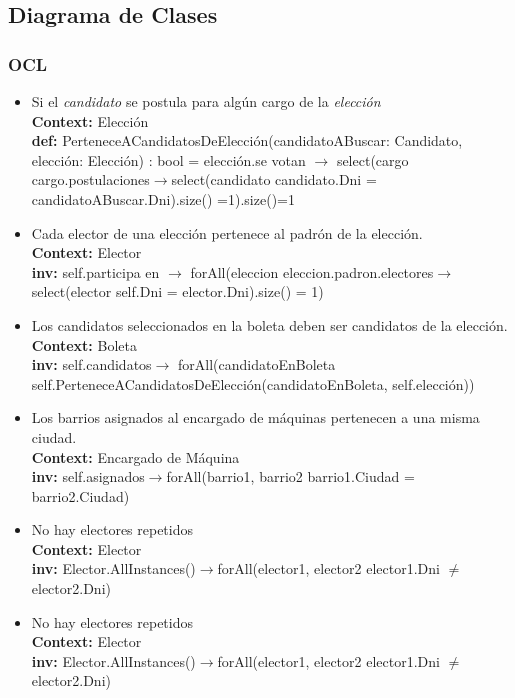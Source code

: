 \documentclass[spanish, 10pt,a4paper]{article}
\numberwithin{equation}{section} %
\begin{document}
\subsection{Diagrama de Clases}
\subsubsection{OCL}
\begin{itemize}
	\item Si el \textit{candidato} se postula para algún cargo de la \textit{elección}
\\	\textbf{Context: }  Elección
\\	\textbf{def: }PerteneceACandidatosDeElección(candidatoABuscar: Candidato, elección: Elección) : bool = elección.se votan $\rightarrow$ select(cargo \textbar cargo.postulaciones$\rightarrow$select(candidato \textbar candidato.Dni = candidatoABuscar.Dni).size() =1).size()=1

	\item Cada elector de una elección pertenece al padrón de la elección.
\\	\textbf{Context: }  Elector
\\	\textbf{inv: }self.participa en $\rightarrow$ forAll(eleccion \textbar eleccion.padron.electores$\rightarrow$select(elector \textbar self.Dni = elector.Dni).size() = 1)

	\item Los candidatos seleccionados en la boleta deben ser candidatos de la elección.
\\	\textbf{Context: }  Boleta
\\	\textbf{inv: }self.candidatos$\rightarrow$ forAll(candidatoEnBoleta \textbar self.PerteneceACandidatosDeElección(candidatoEnBoleta, self.elección))

	\item Los barrios asignados al encargado de máquinas pertenecen a una misma ciudad.
\\	\textbf{Context: }  Encargado de Máquina
\\	\textbf{inv: } self.asignados$\rightarrow$forAll(barrio1, barrio2 \textbar barrio1.Ciudad = barrio2.Ciudad)

	\item No hay electores repetidos
\\	\textbf{Context: }  Elector
\\	\textbf{inv: } Elector.AllInstances()$\rightarrow$forAll(elector1, elector2 \textbar elector1.Dni $\neq$ elector2.Dni)

	\item No hay electores repetidos
\\	\textbf{Context: }  Elector
\\	\textbf{inv: } Elector.AllInstances()$\rightarrow$forAll(elector1, elector2 \textbar elector1.Dni $\neq$ elector2.Dni)


\end{itemize}
\end{document}
